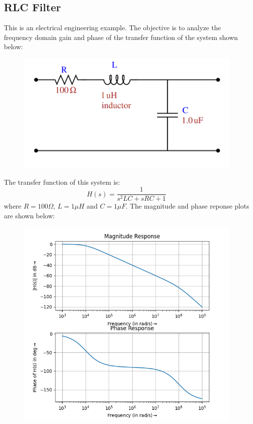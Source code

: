 \documentclass[12pt, a4paper]{article}
\begin{document}
\subsection{RLC Filter}
This is an electrical engineering example. The objective is to analyze the frequency domain gain and phase of the transfer function of the system shown below:
\begin{figure}[H]
    \centering
    \includegraphics[scale = 0.8]{Figure_rlc.png}
    \label{fig:sample}
\end{figure}
The transfer function of this system is:
\begin{equation*}
    H(s) = \frac{1}{s^{2}LC+sRC+1}
\end{equation*}
where $R = 100 \Omega$, $L = 1\mu H$ and $C = 1\mu F$. The magnitude and phase reponse plots are shown below:
\begin{figure}[H]
    \centering
    \includegraphics[scale = 1]{Figure_9.png}
    \label{fig:sample}
\end{figure}
\end{document}
